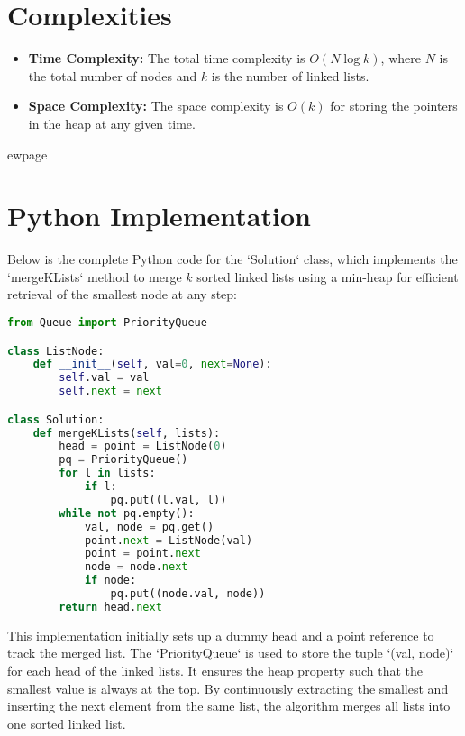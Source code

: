 \section*{Complexities}
\begin{itemize}
	\item \textbf{Time Complexity:} The total time complexity is \(O(N \log k)\), where \(N\) is the total number of nodes and \(k\) is the number of linked lists.
	\item \textbf{Space Complexity:} The space complexity is \(O(k)\) for storing the pointers in the heap at any given time.
\end{itemize}


ewpage %
\section*{Python Implementation}
Below is the complete Python code for the `Solution` class, which implements the `mergeKLists` method to merge \(k\) sorted linked lists using a min-heap for efficient retrieval of the smallest node at any step:

\begin{fullwidth}
\begin{lstlisting}[language=Python]
from Queue import PriorityQueue

class ListNode:
    def __init__(self, val=0, next=None):
        self.val = val
        self.next = next

class Solution:
    def mergeKLists(self, lists):
        head = point = ListNode(0)
        pq = PriorityQueue()
        for l in lists:
            if l:
                pq.put((l.val, l))
        while not pq.empty():
            val, node = pq.get()
            point.next = ListNode(val)
            point = point.next
            node = node.next
            if node:
                pq.put((node.val, node))
        return head.next
\end{lstlisting}

\end{fullwidth}

This implementation initially sets up a dummy head and a point reference to track the merged list. The `PriorityQueue` is used to store the tuple `(val, node)` for each head of the linked lists. It ensures the heap property such that the smallest value is always at the top. By continuously extracting the smallest and inserting the next element from the same list, the algorithm merges all lists into one sorted linked list.

